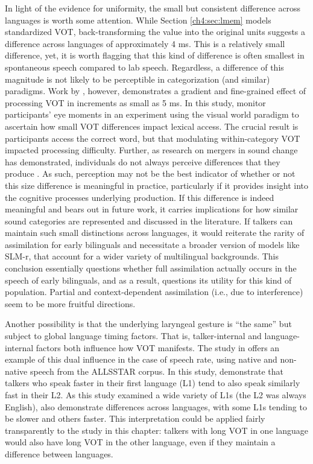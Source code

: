 In light of the evidence for uniformity, the small but consistent difference across languages is worth some attention. While Section \ref{ch4:sec:lmem} models standardized VOT, back-transforming the value into the original units suggests a difference across languages of approximately 4 ms. This is a relatively small difference, yet, it is worth flagging that this kind of difference is often smallest in spontaneous speech compared to lab speech. Regardless, a difference of this magnitude is not likely to be perceptible in categorization (and similar) paradigms. Work by \citet{mcmurray_2002_gradient}, however, demonstrates a gradient and fine-grained effect of processing VOT in increments as small as 5 ms. In this study, \citeauthor{mcmurray_2002_gradient} monitor participants' eye moments in an experiment using the visual world paradigm to ascertain how small VOT differences impact lexical access. The crucial result is participants access the correct word, but that modulating within-category VOT impacted processing difficulty. Further, as research on mergers in sound change has demonstrated, individuals do not always perceive differences that they produce \citep{yu_2019_individual, cheng_UR_production}. As such, perception may not be the best indicator of whether or not this size difference is meaningful in practice, particularly if it provides insight into the cognitive processes underlying production. If this difference is indeed meaningful and bears out in future work, it carries implications for how similar sound categories are represented and discussed in the literature. If talkers can maintain such small distinctions across languages, it would reiterate the rarity of assimilation for early bilinguals and necessitate a broader version of models like SLM-r, that account for a wider variety of multilingual backgrounds. This conclusion essentially questions whether full assimilation actually occurs in the speech of early bilinguals, and as a result, questions its utility for this kind of population. Partial and context-dependent assimilation (i.e., due to interference) seem to be more fruitful directions.

Another possibility is that the underlying laryngeal gesture is ``the same'' but subject to global language timing factors. That is, talker-internal and language-internal factors both influence how VOT manifests. The study in \citet{bradlow_2017_rate} offers an example of this dual influence in the case of speech rate, using native and non-native speech from the ALLSSTAR corpus. In this study, \citeauthor{bradlow_2017_rate} demonstrate that talkers who speak faster in their first language (L1) tend to also speak similarly fast in their L2. As this study examined a wide variety of L1s (the L2 was always English), \citeauthor{bradlow_2017_rate} also demonstrate differences across languages, with some L1s tending to be slower and others faster. This interpretation could be applied fairly transparently to the study in this chapter: talkers with long VOT in one language would also have long VOT in the other language, even if they maintain a difference between languages. 

